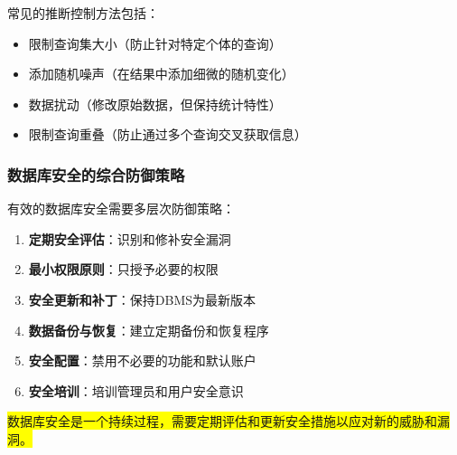 \documentclass{../../note}
\begin{document}
常见的推断控制方法包括：
\begin{itemize}
    \item 限制查询集大小（防止针对特定个体的查询）
    \item 添加随机噪声（在结果中添加细微的随机变化）
    \item 数据扰动（修改原始数据，但保持统计特性）
    \item 限制查询重叠（防止通过多个查询交叉获取信息）
\end{itemize}

\subsubsection{数据库安全的综合防御策略}
有效的数据库安全需要多层次防御策略：
\begin{enumerate}
    \item \textbf{定期安全评估}：识别和修补安全漏洞
    \item \textbf{最小权限原则}：只授予必要的权限
    \item \textbf{安全更新和补丁}：保持DBMS为最新版本
    \item \textbf{数据备份与恢复}：建立定期备份和恢复程序
    \item \textbf{安全配置}：禁用不必要的功能和默认账户
    \item \textbf{安全培训}：培训管理员和用户安全意识
\end{enumerate}

\colorbox{yellow}{数据库安全是一个持续过程，需要定期评估和更新安全措施以应对新的威胁和漏洞。}
\end{document}
